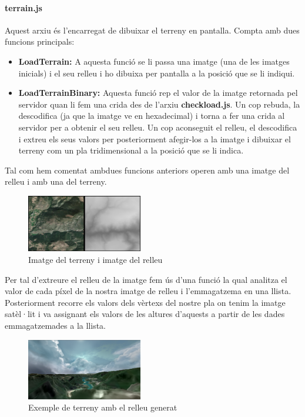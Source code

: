 ﻿\documentclass[10pt,a4paper,twocolumn,twoside]{article}
\begin{document}
\paragraph{terrain.js}
Aquest arxiu és l'encarregat de dibuixar el terreny en pantalla. Compta amb dues funcions principals:
\begin{itemize}
\item \textbf{LoadTerrain:} A aquesta funció se li passa una imatge (una de les imatges inicials) i el seu relleu i ho dibuixa per pantalla a la posició que se li indiqui.
\item \textbf{LoadTerrainBinary:} Aquesta funció rep el valor de la imatge retornada pel servidor quan li fem una crida des de l'arxiu \textbf{checkload.js}. Un cop rebuda, la descodifica (ja que la imatge ve en hexadecimal) i torna a fer una crida al servidor per a obtenir el seu relleu. Un cop aconseguit el relleu, el descodifica i extreu els seus valors per posteriorment afegir-los a la imatge i dibuixar el terreny com un pla tridimensional a la posició que se li indica.
\end{itemize}
Tal com hem comentat ambdues funcions anteriors operen amb una imatge del relleu i amb una del terreny.

\begin{figure}[H]
\centering
\includegraphics[width=0.45\textwidth]{img/img_relleu.png}
\caption{Imatge del terreny i imatge del relleu}
\end{figure}

Per tal d'extreure el relleu de la imatge fem ús d'una funció la qual analitza el valor de cada píxel de la nostra imatge de relleu i l'emmagatzema en una llista. Posteriorment recorre els valors dels vèrtexs del nostre pla on tenim la imatge satèl·lit i va assignant els valors de les altures d'aquests a partir de les dades emmagatzemades a la llista.

\begin{figure}[h]
\centering
\includegraphics[width=0.45\textwidth]{img/relleu.png}
\caption{Exemple de terreny amb el relleu generat}
\end{figure}
\end{document}
